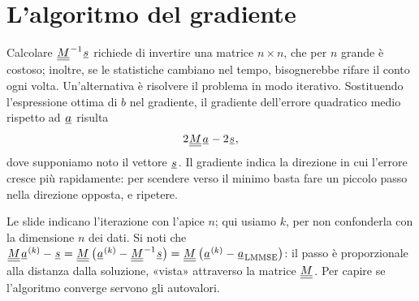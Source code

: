 \section{L'algoritmo del gradiente}

Calcolare ${\mkern1mu\underline{\underline{M}}\mkern1mu}^{-1}{\mkern1mu\underline{s}\mkern1mu}$ richiede di invertire una matrice $n \times n$, che per $n$ grande è costoso; inoltre,
se le statistiche cambiano nel tempo, bisognerebbe rifare il conto ogni volta. Un'alternativa è risolvere il problema
in modo iterativo. Sostituendo l'espressione ottima di $b$ nel gradiente, il gradiente dell'errore quadratico medio
rispetto ad ${\mkern1mu\underline{a}\mkern1mu}$ risulta
\[ 2{\mkern1mu\underline{\underline{M}}\mkern1mu}{\mkern1mu\underline{a}\mkern1mu} - 2{\mkern1mu\underline{s}\mkern1mu} , \]
dove supponiamo noto il vettore ${\mkern1mu\underline{s}\mkern1mu}$. Il gradiente indica la direzione in cui l'errore cresce più rapidamente:
per scendere verso il minimo basta fare un piccolo passo nella direzione opposta, e ripetere.


Le slide indicano l'iterazione con l'apice $n$; qui usiamo $k$, per non confonderla con la dimensione $n$ dei dati. Si
noti che ${\mkern1mu\underline{\underline{M}}\mkern1mu}{\mkern1mu\underline{a}\mkern1mu}^{(k)} - {\mkern1mu\underline{s}\mkern1mu} = {\mkern1mu\underline{\underline{M}}\mkern1mu} \left( {\mkern1mu\underline{a}\mkern1mu}^{(k)} - {\mkern1mu\underline{\underline{M}}\mkern1mu}^{-1}{\mkern1mu\underline{s}\mkern1mu} \right) =
{\mkern1mu\underline{\underline{M}}\mkern1mu} \left( {\mkern1mu\underline{a}\mkern1mu}^{(k)} - {\mkern1mu\underline{a}\mkern1mu}_{\text{LMMSE}} \right)$: il passo è proporzionale alla distanza dalla
soluzione, «vista» attraverso la matrice ${\mkern1mu\underline{\underline{M}}\mkern1mu}$. Per capire se l'algoritmo converge servono gli autovalori.

